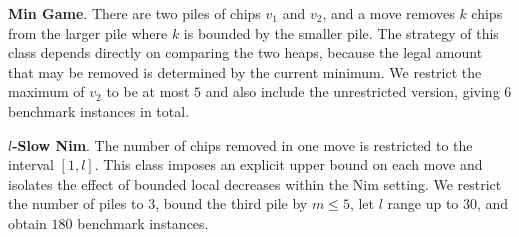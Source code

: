 \documentclass[review]{elsarticle}
\newcommand{\set}[1]{\{ #1 \}}
\newcommand{\tuple}[1]{\langle {#1} \rangle}
\newcommand{\true}{\top}
\newcommand{\statevar}{\mathcal{X}}
\newcommand{\act}{\mathcal{A}}
\newcommand{\constraint}{\mathcal{C}}
\newcommand{\estate}{\mathcal{E}}
\newcommand{\pre}{\mathtt{pre}}
\newcommand{\eff}{\mathtt{eff}}
\begin{document}
{\color{red}\textbf{Min Game}. There are two piles of chips $v_1$ and $v_2$, and a move removes $k$ chips from the larger pile where $k$ is bounded by the smaller pile.}
{\color{red}The strategy of this class depends directly on comparing the two heaps, because the legal amount that may be removed is determined by the current minimum.}
{\color{red}We restrict the maximum of $v_2$ to be at most $5$ and also include the unrestricted version, giving $6$ benchmark instances in total.}

{\color{red}\textbf{$l$-Slow Nim}. The number of chips removed in one move is restricted to the interval $[1,l]$.}
{\color{red}This class imposes an explicit upper bound on each move and isolates the effect of bounded local decreases within the Nim setting.}
{\color{red}We restrict the number of piles to $3$, bound the third pile by $m \le 5$, let $l$ range up to $30$, and obtain $180$ benchmark instances.}
\end{document}
